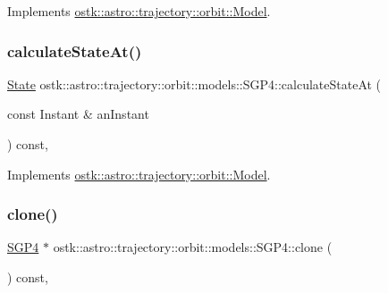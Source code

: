 Implements \hyperlink{classostk_1_1astro_1_1trajectory_1_1orbit_1_1_model_aeecf4cc22fa9c766801936c468cc52ac}{ostk\+::astro\+::trajectory\+::orbit\+::\+Model}.

\mbox{\label{classostk_1_1astro_1_1trajectory_1_1orbit_1_1models_1_1_s_g_p4_ad88439d9c46a75d3da8c20d2872271e3}} 
\subsubsection{\texorpdfstring{calculate\+State\+At()}{calculateStateAt()}}
{\footnotesize\ttfamily \hyperlink{classostk_1_1astro_1_1trajectory_1_1_state}{State} ostk\+::astro\+::trajectory\+::orbit\+::models\+::\+S\+G\+P4\+::calculate\+State\+At (\begin{DoxyParamCaption}\item[{const Instant \&}]{an\+Instant }\end{DoxyParamCaption}) const\hspace{0.3cm}{\ttfamily [override]}, {\ttfamily [virtual]}}



Implements \hyperlink{classostk_1_1astro_1_1trajectory_1_1orbit_1_1_model_a34a0d8979ec1f7ade3e434fc0dad3711}{ostk\+::astro\+::trajectory\+::orbit\+::\+Model}.

\mbox{\label{classostk_1_1astro_1_1trajectory_1_1orbit_1_1models_1_1_s_g_p4_afb9928e09d66c13a77eb1126da6139eb}} 
\subsubsection{\texorpdfstring{clone()}{clone()}}
{\footnotesize\ttfamily \hyperlink{classostk_1_1astro_1_1trajectory_1_1orbit_1_1models_1_1_s_g_p4}{S\+G\+P4} $\ast$ ostk\+::astro\+::trajectory\+::orbit\+::models\+::\+S\+G\+P4\+::clone (\begin{DoxyParamCaption}{ }\end{DoxyParamCaption}) const\hspace{0.3cm}{\ttfamily [override]}, {\ttfamily [virtual]}}



